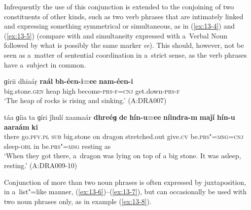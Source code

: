 Infrequently the use of this conjunction is extended to the conjoining of two constituents of other kinds, such as two verb phrases that are intimately linked and expressing something symmetrical or simultaneous, as in (\ref{ex:13-4}) and (\ref{ex:13-5}) (compare with  and simultaneity expressed with a~Verbal Noun followed by what is possibly the same marker \textit{ee}). This should, however, not be seen as a~matter of sentential coordination in a~strict sense, as the verb phrases have a~subject in common.

\begin{exe}
\ex
\label{ex:13-4}
\gll ɡírii dhiaáṛ \textbf{raál} \textbf{bh-éen-i=ee} \textbf{nam-éen-i}  \\
big.stone.\textsc{gen} heap high become-\textsc{prs-f=cnj} get.down-\textsc{prs-f}  \\
\glt `The heap of rocks is rising and sinking.' (A:DRA007)

\ex
\label{ex:13-5}
\gll táa ɡíia ta ɡíri ǰhulí xaamaár \textbf{dhreéɡ} \textbf{de} \textbf{hín-u=ee} \textbf{níindra-m} \textbf{maǰí} \textbf{hín-u} \textbf{aaraám} \textbf{ki} \\
there go.\textsc{pfv.pl} \textsc{sub} big.stone on dragon stretched.out  give.\textsc{cv} be.\textsc{prs"=msg=cnj} sleep-\textsc{obl} in be.\textsc{prs"=msg}  resting as\\
\glt `When they got there, a~dragon was lying on top of a big stone. It was asleep, resting.' (A:DRA009-10) 
\end{exe}

 Conjunction of more than two noun phrases is often expressed by juxtaposition, in a~list"=like manner, (\ref{ex:13-6})--(\ref{ex:13-7}), but can occasionally be used with two noun phrases only, as in example (\ref{ex:13-8}).

